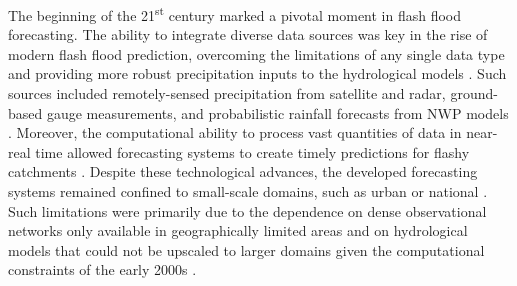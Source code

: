 The  beginning of the 21\textsuperscript{st} century marked a pivotal moment in flash flood forecasting. The ability to integrate diverse data sources was key in the rise of modern flash flood prediction, overcoming the limitations of any single data type and providing more robust precipitation inputs to the hydrological models \citep{Singh_2002, Todini_2011}. Such sources included remotely-sensed precipitation from satellite and radar, ground-based gauge measurements, and probabilistic rainfall forecasts from NWP models \citep{Gouweleeuw_2005}. Moreover, the computational ability to process vast quantities of data in near-real time allowed forecasting systems to create timely predictions for flashy catchments \citep{Liang_2016, Leong_2017}. Despite these technological advances, the developed forecasting systems remained confined to small-scale domains, such as urban \citep{ Speight_2018, Ibarreche_2020} or national \citep{Javelle_2016}. Such limitations were primarily due to the dependence on dense observational networks only available in geographically limited areas \citep{Gaume_2009} and on hydrological models that could not be upscaled to larger domains given the computational constraints of the early 2000s \citep{Hapuarachchi_2011}. 

